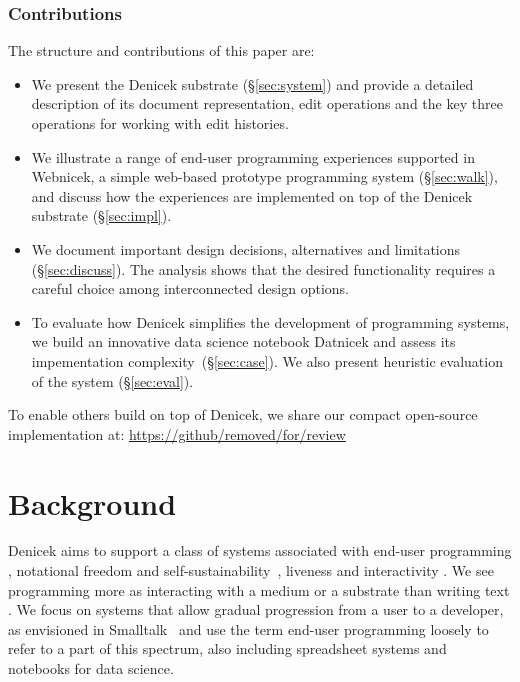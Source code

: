\documentclass[sigconf,anonymous,screen]{acmart}
\begin{document}
\subsubsection*{Contributions}
The structure and contributions of this paper are:

\begin{itemize}
\item We present the Denicek substrate (\S\ref{sec:system}) and provide a detailed description of its
  document representation, edit operations and the key three operations for working with edit histories.
\item We illustrate a range of end-user programming experiences supported in Webnicek, a simple
  web-based prototype programming system (\S\ref{sec:walk}), and discuss how the experiences are
  implemented on top of the Denicek substrate (\S\ref{sec:impl}).
\item We document important design decisions, alternatives and limitations (\S\ref{sec:discuss}).
  The analysis shows that the desired functionality requires a careful choice among interconnected
  design options.
\item To evaluate how Denicek simplifies the development of program\-ming systems, we
  build an innovative data science notebook Datnicek and assess its impementation
  complexity~(\S\ref{sec:case}). We also present heuristic evaluation of the system (\S\ref{sec:eval}).
\end{itemize}

\noindent
To enable others build on top of Denicek, we share our compact open-source
implementation at: \url{https://github/removed/for/review} %


\section{Background}
\label{sec:background}
Denicek aims to support a class of systems associated with end-user programming \cite{myers-2006-eup},
notational freedom and self-sustainability~\cite{jakubovic-2023-techdims}, liveness and interactivity
\cite{horowitz-2023-qualities,rein-2019-live}. We see programming more as interacting with a medium
or a substrate \cite{kay-1977-media,klokmose-2015-webstrates} than writing text \cite{rpg-2012-revolution}.
We focus on systems that allow gradual progression from a user to a developer, as envisioned
in Smalltalk~\cite{reenskaug-1981-byte} and use the term end-user programming loosely to refer to a
part of this spectrum, also including spreadsheet systems and notebooks for data science.
\end{document}

